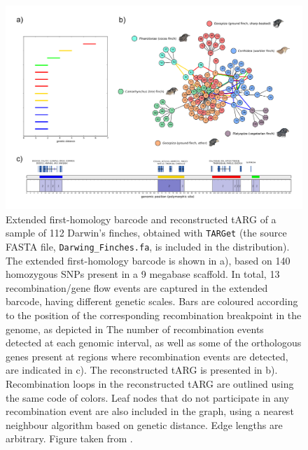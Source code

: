\documentclass[12pt]{article}
\begin{document}
\begin{figure}[!ht]
\centering
\includegraphics[width=16cm, angle=0]{finches.png}
\caption{Extended first-homology barcode and reconstructed tARG of a sample of 112 Darwin's finches, obtained with \texttt{TARGet} (the source FASTA file, \texttt{Darwing\_Finches.fa}, is included in the distribution). The extended first-homology barcode is shown in a), based on 140 homozygous SNPs present in a 9 megabase scaffold. In total, 13 recombination/gene flow events are captured in the extended barcode, having different genetic scales. Bars are coloured according to the position of the corresponding recombination breakpoint in the genome, as depicted in The number of recombination events detected at each genomic interval, as well as some of the orthologous genes present at regions where recombination events are detected, are indicated in c). The reconstructed tARG is presented in b). Recombination loops in the reconstructed tARG are outlined using the same code of colors. Leaf nodes that do not participate in any recombination event are also included in the graph, using a nearest neighbour algorithm based on genetic distance. Edge lengths are arbitrary. Figure taken from \cite{target}.
\label{fig7}}
\end{figure} 

\newpage
\end{document}
